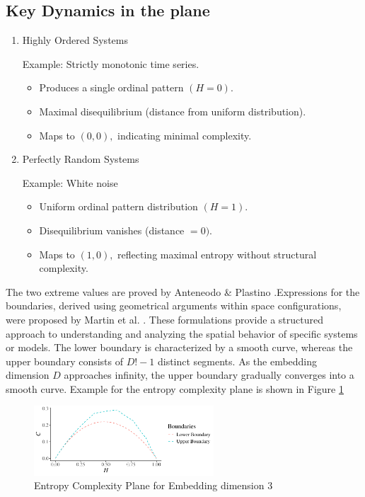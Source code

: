 \subsection{Key Dynamics in the plane}
\begin{enumerate}
	\item Highly Ordered Systems
	
	Example: Strictly monotonic time series.
	\begin{itemize}
		\item Produces a single ordinal pattern $(H=0)$.
		
		\item Maximal disequilibrium (distance from uniform distribution).
		
		\item Maps to $(0,0),$ indicating minimal complexity.
	\end{itemize}
	
	\item Perfectly Random Systems
	
	Example: White noise
	\begin{itemize}
		\item Uniform ordinal pattern distribution $(H=1)$.
		\item Disequilibrium vanishes (distance $=0)$.
		\item Maps to $(1,0),$ reflecting maximal entropy without structural complexity.
	\end{itemize}
\end{enumerate}
The two extreme values are proved by Anteneodo \& Plastino \cite{anteneodo1996some}.Expressions for the boundaries, derived using geometrical arguments within space configurations, were proposed by Martin et al. \cite{Martin2006}. These formulations provide a structured approach to understanding and analyzing the spatial behavior of specific systems or models. The lower boundary is characterized by a smooth curve, whereas the upper boundary consists of $D!-1$ distinct segments. As the embedding dimension $D$ approaches infinity, the upper boundary gradually converges into a smooth curve. 
Example for the entropy complexity plane is shown in Figure \ref{fig:complexity}

\begin{figure}[H]
	\centering
	\includegraphics[width=0.6\textwidth]{complexity plane}
	\caption{Entropy Complexity Plane for Embedding dimension 3}
	\label{fig:complexity}
\end{figure}


